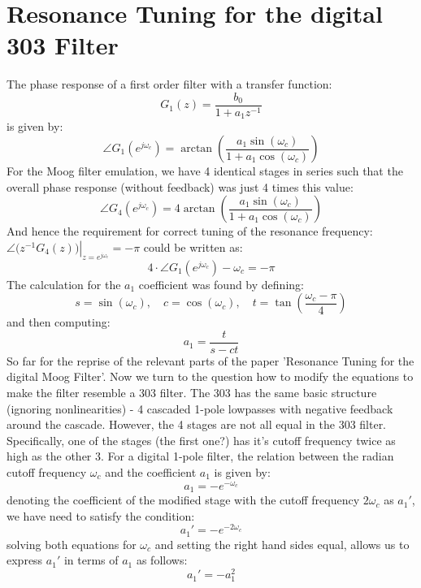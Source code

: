 \section{Resonance Tuning for the digital 303 Filter}

The phase response of a first order filter with a transfer function:
\begin{equation}
 G_1(z) = \frac{b_0}{1 + a_1 z^{-1}}
\end{equation}
is given by: 
\begin{equation}
 \angle G_1(e^{j \omega_c}) = \arctan \left(\frac{a_1 \sin (\omega_c)}
                                                 {1 + a_1 \cos (\omega_c)} \right)
\end{equation}
For the Moog filter emulation, we have 4 identical stages in series such that the overall phase response (without feedback) was just 4 times this value:
\begin{equation}
 \angle G_4(e^{j \omega_c}) = 4 \arctan \left(\frac{a_1 \sin (\omega_c)}
                                                  {1 + a_1 \cos (\omega_c)} \right)
\end{equation}
And hence the requirement for correct tuning of the resonance frequency: $\left. \angle \big( z^{-1} G_4(z) \big) \right|_{z=e^{j \omega_c}} = -\pi$ could be written as: 
\begin{equation}
4 \cdot \angle G_1(e^{j \omega_c}) - \omega_c = -\pi
\end{equation}
The calculation for the $a_1$ coefficient was found by defining:
\begin{equation}
\label{eqn:sct}
\boxed
{
 s = \sin(\omega_c), \quad c = \cos(\omega_c), \quad t = \tan \left( \frac{\omega_c-\pi}{4} \right)
}
\end{equation}
and then computing:
\begin{equation}
\boxed
{
 a_1 =  \frac{t}{s - c t}
}
\end{equation}
So far for the reprise of the relevant parts of the paper 'Resonance Tuning for the digital Moog Filter'. Now we turn to the question how to modify the equations to make the filter resemble a 303 filter. The 303 has the same basic structure (ignoring nonlinearities) - 4 cascaded 1-pole lowpasses with negative feedback around the cascade. However, the 4 stages are not all equal in the 303 filter. Specifically, one of the stages (the first one?) has it's cutoff frequency twice as high as the other 3. For a digital 1-pole filter, the relation between the radian cutoff frequency $\omega_c$ and the coefficient $a_1$ is given by:
\begin{equation}
 a_1 = - e^{-\omega_c}
\end{equation}
denoting the coefficient of the modified stage with the cutoff frequency $2 \omega_c$ as $a_1'$, we have need to satisfy the condition:
\begin{equation}
 a_1' = - e^{-2\omega_c}
\end{equation}
solving both equations for $\omega_c$ and setting the right hand sides equal, allows us to express $a_1'$ in terms of $a_1$ as follows:
\begin{equation}
 a_1' = - a_1^2
\end{equation}

